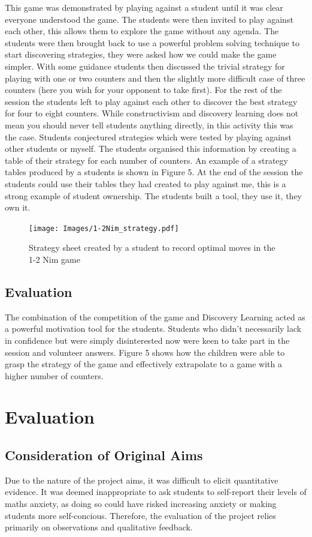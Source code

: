\documentclass[11pt, a4paper, notitlepage]{article}
\begin{document}
This game was demonstrated by playing against a student until it was clear everyone understood the game. The students were then invited to play against each other, this allows them to explore the game without any agenda. The students were then brought back to use a powerful problem solving technique to start discovering strategies, they were asked how we could make the game simpler. With some guidance students then discussed the trivial strategy for playing with one or two counters and then the slightly more difficult case of three counters (here you wish for your opponent to take first). For the rest of the session the students left to play against each other to discover the best strategy for four to eight counters. While constructivism and discovery learning does not mean you should never tell students anything directly, in this activity this was the case. Students conjectured strategies which were tested by playing against other students or myself. The students organised this information by creating a table of their strategy for each number of counters. An example of a strategy tables produced by a students is shown in Figure 5. At the end of the session the students could use their tables they had created to play against me, this is a strong example of student ownership. The students built a tool, they use it, they own it. 
\begin{figure}[htbp]
    \centering
    \texttt{[image: Images/1-2Nim\_strategy.pdf]}
    \caption{Strategy sheet created by a student to record optimal moves in the 1-2 Nim game}
\end{figure}

\subsection*{Evaluation}
The combination of the competition of the game and Discovery Learning acted as a powerful motivation tool for the students. Students who didn't necessarily lack in confidence but were simply disinterested now were keen to take part in the session and  volunteer answers. Figure 5 shows how the children were able to grasp the strategy of the game and effectively extrapolate to a game with a higher number of counters.
\section{Evaluation}

\subsection{Consideration of Original Aims}
Due to the nature of the project aims, it was difficult to elicit quantitative evidence. It was deemed inappropriate to ask students to self-report their levels of maths anxiety, as doing so could have risked increasing anxiety or making students more self-concious. Therefore, the evaluation of the project relies primarily on observations and qualitative feedback.
\end{document}
